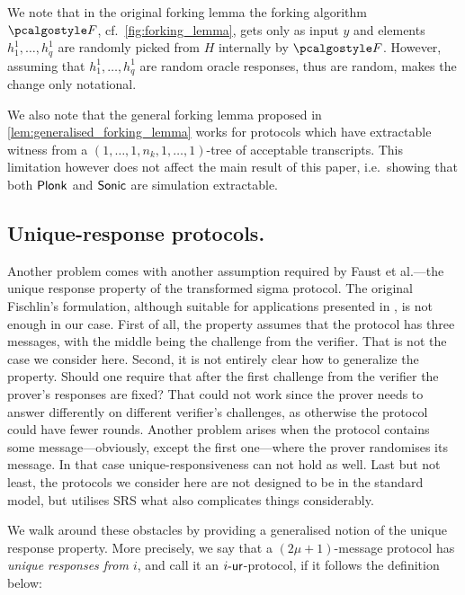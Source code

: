 \documentclass[runningheads,11pt]{llncs}
\begin{document}
We note that in the original forking lemma the forking algorithm $\forking$,
cf.~\cref{fig:forking_lemma}, gets only as input $y$ and elements $h^1_1, \ldots,
h^1_q$ are randomly picked from $H$ internally by $\forking$. However, assuming
that $h^1_1, \ldots, h^1_q$ are random oracle responses, thus are random, makes
the change only notational.

We also note that the general forking lemma proposed in
\cref{lem:generalised_forking_lemma} works for protocols which have extractable
witness from a $(1, \ldots, 1, n_k, 1, \ldots, 1)$-tree of acceptable
transcripts. This limitation however does not affect the main result of this
paper, i.e.~showing that both $\textnormal{\textsf{Plonk}}$ and ${\textnormal{\textsf{Sonic}}}$ are simulation extractable.

\subsection{Unique-response protocols.}
Another problem comes with another assumption required by Faust et al.---the
unique response property of the transformed sigma protocol. The original
Fischlin's formulation, although suitable for applications presented in
\cite{C:Fischlin05,INDOCRYPT:FKMV12}, is not enough in our case. First of all,
the property assumes that the protocol has three messages, with the middle being
the challenge from the verifier. That is not the case we consider here. Second,
it is not entirely clear how to generalize the property. Should one require that
after the first challenge from the verifier the prover's responses are fixed?
That could not work since the prover needs to answer differently on different
verifier's challenges, as otherwise the protocol could have fewer
rounds. Another problem arises when the protocol contains some
message---obviously, except the first one---where the prover randomises its
message. In that case unique-responsiveness can not hold as well. Last but not
least, the protocols we consider here are not designed to be in the standard
model, but utilises SRS what also complicates things considerably.

We walk around these obstacles by providing a generalised notion of the unique
response property. More precisely, we say that a $(2\mu + 1)$-message protocol
has \emph{unique responses from $i$}, and call it an ${i\text{-}\mathsf{ur}}$-protocol, if it
follows the definition below:
\end{document}
